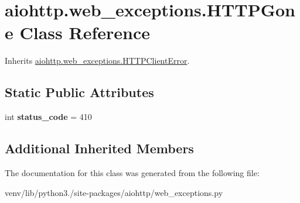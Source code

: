 \hypertarget{classaiohttp_1_1web__exceptions_1_1_h_t_t_p_gone}{}\section{aiohttp.\+web\+\_\+exceptions.\+H\+T\+T\+P\+Gone Class Reference}
\label{classaiohttp_1_1web__exceptions_1_1_h_t_t_p_gone}


Inherits \hyperlink{classaiohttp_1_1web__exceptions_1_1_h_t_t_p_client_error}{aiohttp.\+web\+\_\+exceptions.\+H\+T\+T\+P\+Client\+Error}.

\subsection*{Static Public Attributes}
\begin{DoxyCompactItemize}
\item 
\mbox{\label{classaiohttp_1_1web__exceptions_1_1_h_t_t_p_gone_ae101799cbec02d354427d9f43cbf5d4c}} 
int {\bfseries status\+\_\+code} = 410
\end{DoxyCompactItemize}
\subsection*{Additional Inherited Members}


The documentation for this class was generated from the following file\+:\begin{DoxyCompactItemize}
\item 
venv/lib/python3./site-\/packages/aiohttp/web\+\_\+exceptions.\+py\end{DoxyCompactItemize}
